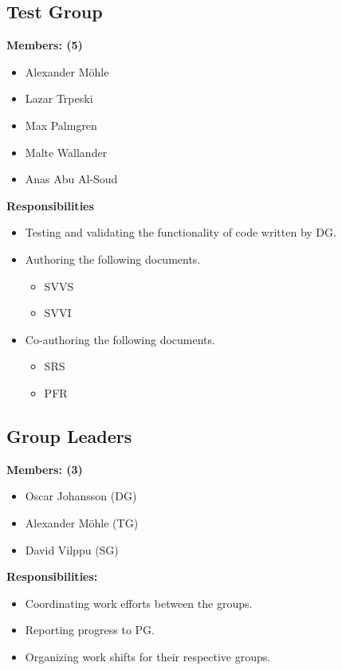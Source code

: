 \documentclass{article}
\begin{document}
    \subsection{Test Group}
        \textbf{Members: (5)}
        \begin{itemize}
            \item Alexander Möhle
            \item Lazar Trpeski
            \item Max Palmgren
            \item Malte Wallander
            \item Anas Abu Al-Soud
        \end{itemize}
        \textbf{Responsibilities}
        \begin{itemize}
            \item Testing and validating the functionality of code written by DG.
            \item Authoring the following documents.
            \begin{itemize}
                \item SVVS
                \item SVVI
            \end{itemize}
            \item Co-authoring the following documents.
                \begin{itemize}
                    \item SRS
                    \item PFR
                \end{itemize}
        \end{itemize}
    
    \subsection{Group Leaders}
        \textbf{Members: (3)}
        \begin{itemize}
            \item Oscar Johansson (DG)
            \item Alexander Möhle (TG)
            \item David Vilppu (SG)
        \end{itemize}
        \textbf{Responsibilities: }
        \begin{itemize}
            \item Coordinating work efforts between the groups. 
            \item Reporting progress to PG.
            \item Organizing work shifts for their respective groups. 
        \end{itemize}
        
\end{document}

